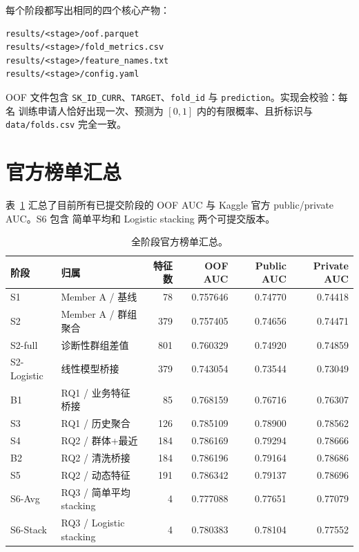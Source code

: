 \documentclass[11pt,UTF8,fontset=windows]{ctexrep}
\begin{document}
每个阶段都写出相同的四个核心产物：

\begin{verbatim}
results/<stage>/oof.parquet
results/<stage>/fold_metrics.csv
results/<stage>/feature_names.txt
results/<stage>/config.yaml
\end{verbatim}

OOF 文件包含 \texttt{SK\_ID\_CURR}、\texttt{TARGET}、\texttt{fold\_id} 与 \texttt{prediction}。实现会校验：每名
训练申请人恰好出现一次、预测为 $[0,1]$ 内的有限概率、且折标识与 \texttt{data/folds.csv} 完全一致。

\section{官方榜单汇总}

表~\ref{tab:official-summary} 汇总了目前所有已提交阶段的 OOF AUC 与 Kaggle 官方 public/private AUC。S6 包含
简单平均和 Logistic stacking 两个可提交版本。

\begin{table}[h]
\centering
\caption{全阶段官方榜单汇总。}
\label{tab:official-summary}
\small
\setlength{\tabcolsep}{4pt}
\begin{tabular}{llrrrr}
\toprule
阶段 & 归属 & 特征数 & OOF AUC & Public AUC & Private AUC \\
\midrule
S1 & Member A / 基线 & 78 & 0.757646 & 0.74770 & 0.74418 \\
S2 & Member A / 群组聚合 & 379 & 0.757405 & 0.74656 & 0.74471 \\
S2-full & 诊断性群组差值 & 801 & 0.760329 & 0.74920 & 0.74859 \\
S2-Logistic & 线性模型桥接 & 379 & 0.743054 & 0.73544 & 0.73049 \\
B1 & RQ1 / 业务特征桥接 & 85 & 0.768159 & 0.76716 & 0.76307 \\
S3 & RQ1 / 历史聚合 & 126 & 0.785109 & 0.78900 & 0.78562 \\
S4 & RQ2 / 群体+最近 & 184 & 0.786169 & 0.79294 & 0.78666 \\
B2 & RQ2 / 清洗桥接 & 184 & 0.786196 & 0.79164 & 0.78686 \\
S5 & RQ2 / 动态特征 & 191 & 0.786342 & 0.79137 & 0.78696 \\
S6-Avg & RQ3 / 简单平均 stacking & 4 & 0.777088 & 0.77651 & 0.77079 \\
S6-Stack & RQ3 / Logistic stacking & 4 & 0.780383 & 0.78104 & 0.77552 \\
\bottomrule
\end{tabular}
\end{table}
\end{document}
